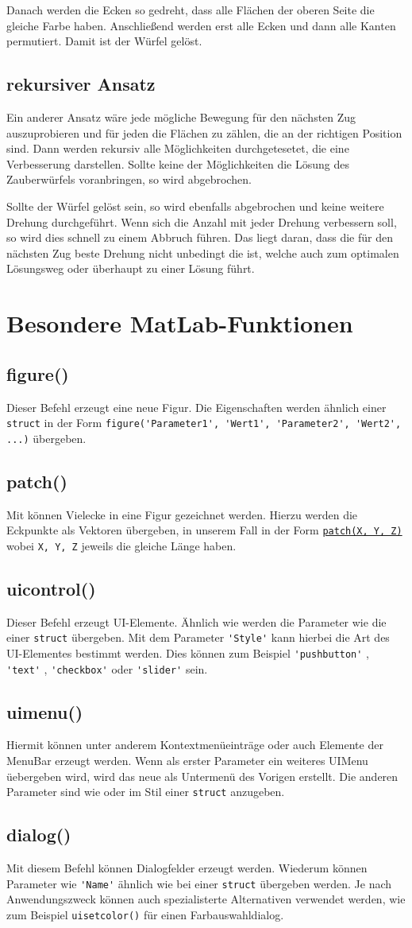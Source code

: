 \documentclass[a4paper,11pt]{scrreprt}
\newcommand{\coderef}[1]{
  \texttt{\nameref{#1}}
}
\newcommand{\codeinline}[1]{
  \lstinline!#1!
}
\newcommand{\codecustomref}[2]{
  \hyperref[#2]{\lstinline!#1!}
}
\newcommand{\chap}[2]{
  \chapter{#1}\label{#2}
}
\renewcommand{\sec}[2]{
  \section{#1}\label{#2}
}
\begin{document}
      Danach werden die Ecken so gedreht, dass alle Flächen der oberen Seite die gleiche Farbe haben.
      Anschließend werden erst alle Ecken und dann alle Kanten permutiert. Damit ist der Würfel gelöst.

    \sec{rekursiver Ansatz}{recursive}
      Ein anderer Ansatz wäre jede mögliche Bewegung für den nächsten Zug auszuprobieren und für jeden die Flächen zu zählen, die an der richtigen Position sind. Dann werden rekursiv alle Möglichkeiten durchgetesetet, die eine Verbesserung darstellen. Sollte keine der Möglichkeiten die Lösung des Zauberwürfels voranbringen, so wird abgebrochen.

      Sollte der Würfel gelöst sein, so wird ebenfalls abgebrochen und keine weitere Drehung durchgeführt. Wenn sich die Anzahl mit jeder Drehung verbessern soll, so wird dies schnell zu einem Abbruch führen. Das liegt daran, dass die für den nächsten Zug beste Drehung nicht unbedingt die ist, welche auch zum optimalen Lösungsweg oder überhaupt zu einer Lösung führt.

  \chap{Besondere MatLab-Funktionen}{matlab}
    \sec{figure()}{figure}
      Dieser Befehl erzeugt eine neue Figur. Die Eigenschaften werden ähnlich einer\codeinline{struct}in der Form\codeinline{figure('Parameter1', 'Wert1', 'Parameter2', 'Wert2', ...)}übergeben.

    \sec{patch()}{patch}
      Mit\coderef{patch}können Vielecke in eine Figur gezeichnet werden. Hierzu werden die Eckpunkte als Vektoren übergeben, in unserem Fall in der Form\codecustomref{patch(X, Y, Z)}{patch}wobei\codeinline{X, Y, Z}jeweils die gleiche Länge haben.

    \sec{uicontrol()}{uicontrol}
      Dieser Befehl erzeugt UI-Elemente. Ähnlich wie\coderef{figure}werden die Parameter wie die einer\codeinline{struct}übergeben. Mit dem Parameter\codeinline{'Style'}kann hierbei die Art des UI-Elementes bestimmt werden. Dies können zum Beispiel\codeinline{'pushbutton'},\codeinline{'text'},\codeinline{'checkbox'}oder\codeinline{'slider'}sein.

    \sec{uimenu()}{uimenu}
      Hiermit können unter anderem Kontextmenüeinträge oder auch Elemente der MenuBar erzeugt werden. Wenn als erster Parameter ein weiteres UIMenu üebergeben wird, wird das neue als Untermenü des Vorigen erstellt. Die anderen Parameter sind wie\coderef{figure}oder\coderef{uicontrol}im Stil einer\codeinline{struct}anzugeben.

    \sec{dialog()}{dialog}
      Mit diesem Befehl können Dialogfelder erzeugt werden. Wiederum können Parameter wie\codeinline{'Name'}ähnlich wie bei einer\codeinline{struct}übergeben werden. Je nach Anwendungszweck können auch spezialisterte Alternativen verwendet werden, wie zum Beispiel\codeinline{uisetcolor()}für einen Farbauswahldialog.
\end{document}

